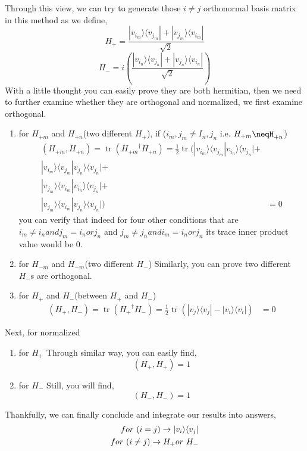 Through this view, we can try to generate those $i \neq j$ orthonormal basis matrix in this method as we define, 
\begin{equation}
   H_{+} = \frac{|v_i_m\rangle\langle v_j_m|+|v_j_m\rangle\langle v_i_m|}{\sqrt{2}}
\end{equation}
\begin{equation}
   H_{-} = i(\frac{|v_i_n\rangle\langle v_j_n|+|v_j_n\rangle\langle v_i_n|}{\sqrt{2}})
\end{equation}
With a little thought you can easily prove they are both hermitian, then we need to further examine whether they are orthogonal and normalized, we first examine orthogonal.
\begin{enumerate}
    \item for $H_{+m}$ and $H_{+n}$(two different $H_{+}$), if ($i_m, j_m \neq I_n, j_n$ i.e. $H_{+m}\neqH_{+n}$)
    \begin{equation}
    \begin{align}
        (H_{+m},H_{+n}) = \operatorname{tr}({H_{+m}}^{\dag}H_{+n}) = \frac{1}{2}\operatorname{tr}(|v_i_m\rangle\langle v_j_m|v_i_n\rangle\langle v_j_n|+&\\|v_i_m\rangle\langle v_j_m|v_j_n\rangle\langle v_j_n|+&\\|v_j_m\rangle\langle v_i_m|v_i_n\rangle\langle v_j_n|+&\\|v_j_m\rangle\langle v_i_m|v_j_n\rangle\langle v_j_n|) &= 0
    \end{align}
    \end{equation}
    you can verify that indeed for four other conditions that are  $i_m \neq i_n and j_m = i_n or j_n$ and $j_m \neq j_n and i_m = i_n or j_n$ its trace inner product value would be 0. 
    \item for $H_{-m}$ and $H_{-m}$(two different $H_{-}$)
    Similarly, you can prove two different $H_{-}$s are orthogonal. 
    \item for $H_{+}$ and $H_{-}$(between $H_{+}$ and $H_{-}$)
    \begin{equation}
    \begin{align}
        (H_{+},H_{-}) = \operatorname{tr}({H_{+}}^{\dag}H_{-}) = \frac{1}{2}\operatorname{tr}(|v_j\rangle\langle v_j|-|v_i\rangle\langle v_i|) &= 0
    \end{align}
    \end{equation}
\end{enumerate}
Next, for normalized
\begin{enumerate}
    \item for $H_{+}$ 
    Through similar way, you can easily find,     \begin{equation}
         (H_{+},H_{+}) = 1
     \end{equation}
    \item for $H_{-}$ Still, you will find,
     \begin{equation}
         (H_{-},H_{-}) = 1
     \end{equation}
\end{enumerate}
Thankfully, we can finally conclude and integrate our results into answers,
\begin{equation}
\begin{split}
    for\ (i = j) \space \rightarrow|v_i\rangle\langle v_j|\\
    for\ (i \neq j)\rightarrow H_{+} or\ H_{-}
\end{split}
\end{equation}


